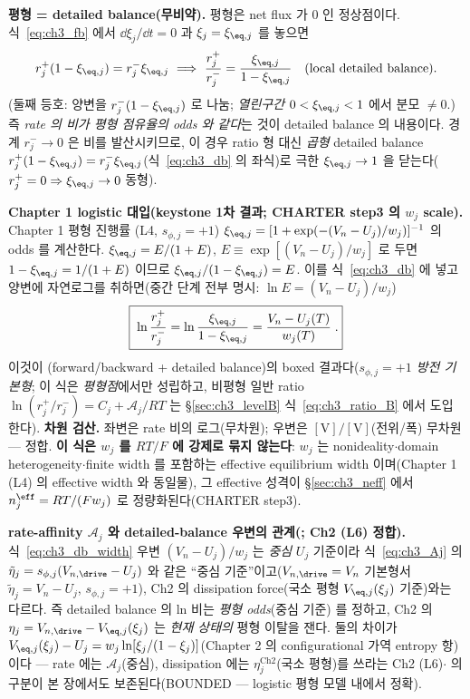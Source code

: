 \textbf{평형 = detailed balance(무비약).} 평형은 net flux 가 $0$ 인 정상점이다. 식~\eqref{eq:ch3_fb} 에서
$\dd\xi_j/\dd t=0$ 과 $\xi_j=\xi_{\eq,j}$ 를 놓으면
\begin{equation}
r_j^+(1-\xi_{\eq,j})=r_j^-\xi_{\eq,j}
\ \Longrightarrow\
\frac{r_j^+}{r_j^-}=\frac{\xi_{\eq,j}}{1-\xi_{\eq,j}}\quad(\text{local detailed balance}).
\label{eq:ch3_db}
\end{equation}
(둘째 등호: 양변을 $r_j^-(1-\xi_{\eq,j})$ 로 나눔; \emph{열린구간} $0<\xi_{\eq,j}<1$ 에서 분모 $\ne0$.) 즉 \emph{rate 의 비가
평형 점유율의 odds 와 같다}는 것이 detailed balance 의 내용이다. 경계 $r_j^-\to0$ 은 비를 발산시키므로, 이 경우
ratio 형 대신 \emph{곱형} detailed balance $r_j^+(1-\xi_{\eq,j})=r_j^-\xi_{\eq,j}$(식~\eqref{eq:ch3_db} 의 좌식)로
극한 $\xi_{\eq,j}\to1$ 을 닫는다($r_j^+=0\Rightarrow\xi_{\eq,j}\to0$ 동형).

\textbf{Chapter 1 logistic 대입(keystone 1차 결과; CHARTER step3 의 $w_j$ scale).} Chapter 1 평형 진행률
(L4, $s_{\phi,j}=+1$) $\xi_{\eq,j}=[1+\exp(-(V_n-U_j)/w_j)]^{-1}$ 의 odds 를 계산한다. $\xi_{\eq,j}=E/(1+E)$,
$E\equiv\exp[(V_n-U_j)/w_j]$ 로 두면 $1-\xi_{\eq,j}=1/(1+E)$ 이므로 $\xi_{\eq,j}/(1-\xi_{\eq,j})=E$. 이를
식~\eqref{eq:ch3_db} 에 넣고 양변에 자연로그를 취하면(중간 단계 전부 명시: $\ln E=(V_n-U_j)/w_j$)
\begin{equation}
\boxed{\;\ln\frac{r_j^+}{r_j^-}=\ln\frac{\xi_{\eq,j}}{1-\xi_{\eq,j}}=\frac{V_n-U_j(T)}{w_j(T)}\;.}
\label{eq:ch3_db_width}
\end{equation}
이것이 (forward/backward + detailed balance)의 boxed 결과다(\emph{$s_{\phi,j}=+1$ 방전 기본형}; 이 식은
\emph{평형점}에서만 성립하고, 비평형 일반 ratio $\ln(r_j^+/r_j^-)=C_j+\mathcal A_j/RT$ 는 \S\ref{sec:ch3_levelB}
식~\eqref{eq:ch3_ratio_B} 에서 도입한다). \textbf{차원 검산.} 좌변은 rate 비의
로그(무차원); 우변은 $[\mathrm V]/[\mathrm V]$(전위/폭) 무차원 — 정합. \textbf{이 식은 $w_j$ 를 $RT/F$ 에 강제로
묶지 않는다}: $w_j$ 는 nonideality$\cdot$domain heterogeneity$\cdot$finite width 를 포함하는 effective
equilibrium width 이며(Chapter 1 (L4) 의 effective width 와 동일물), 그 effective 성격이 \S\ref{sec:ch3_neff}
에서 $n_j^{\eff}=RT/(Fw_j)$ 로 정량화된다(CHARTER step3).
\begin{boundbox}
\textbf{rate-affinity $\mathcal A_j$ 와 detailed-balance 우변의 관계(; Ch2 (L6) 정합).} 식~\eqref{eq:ch3_db_width}
우변 $(V_n-U_j)/w_j$ 는 \emph{중심} $U_j$ 기준이라 식~\eqref{eq:ch3_Aj} 의 $\tilde\eta_j=s_{\phi,j}(V_{n,\drive}-U_j)$
와 같은 ``중심 기준''이고($V_{n,\drive}=V_n$ 기본형서 $\tilde\eta_j=V_n-U_j$, $s_{\phi,j}=+1$), Ch2 의 dissipation
force(국소 평형 $V_{\eq,j}(\xi_j)$ 기준)와는 다르다. 즉 detailed balance 의 ln 비는 \emph{평형 odds}(중심 기준)
를 정하고, Ch2 의 $\eta_j=V_{n,\drive}-V_{\eq,j}(\xi_j)$ 는 \emph{현재 상태의} 평형 이탈을 잰다. 둘의 차이가
$V_{\eq,j}(\xi_j)-U_j=w_j\ln[\xi_j/(1-\xi_j)]$(Chapter 2 의 configurational 가역 entropy 항)이다 — rate 에는
$\mathcal A_j$(중심), dissipation 에는 $\eta_j^{\mathrm{Ch2}}$(국소 평형)를 쓰라는 Ch2 (L6)$\cdot$\AL{28} 의
구분이 본 장에서도 보존된다(BOUNDED — logistic 평형 모델 내에서 정확).
\end{boundbox}


